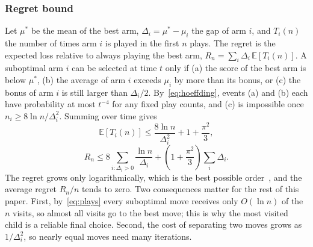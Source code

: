 \subsubsection{Regret bound}
Let $\mu^{*}$ be the mean of the best arm, $\Delta_i = \mu^{*} - \mu_i$ the gap of arm $i$, and $T_i(n)$ the number of times arm $i$ is played in the first $n$ plays. The regret is the expected loss relative to always playing the best arm, $R_n = \sum_i \Delta_i\,\mathbb{E}[T_i(n)]$. A suboptimal arm $i$ can be selected at time $t$ only if (a) the score of the best arm is below $\mu^{*}$, (b) the average of arm $i$ exceeds $\mu_i$ by more than its bonus, or (c) the bonus of arm $i$ is still larger than $\Delta_i/2$. By~\eqref{eq:hoeffding}, events (a) and (b) each have probability at most $t^{-4}$ for any fixed play counts, and (c) is impossible once $n_i \ge 8\ln n/\Delta_i^2$. Summing over time gives~\cite{auer2002finite}
\begin{equation}
\mathbb{E}[T_i(n)] \le \frac{8\ln n}{\Delta_i^2} + 1 + \frac{\pi^2}{3},
\label{eq:plays}
\end{equation}
\begin{equation}
R_n \le 8\sum_{i:\Delta_i>0}\frac{\ln n}{\Delta_i} + \left(1+\frac{\pi^2}{3}\right)\sum_{i}\Delta_i .
\label{eq:regret}
\end{equation}
The regret grows only logarithmically, which is the best possible order~\cite{lai1985asymptotically}, and the average regret $R_n/n$ tends to zero. Two consequences matter for the rest of this paper. First, by~\eqref{eq:plays} every suboptimal move receives only $O(\ln n)$ of the $n$ visits, so almost all visits go to the best move; this is why the most visited child is a reliable final choice. Second, the cost of separating two moves grows as $1/\Delta_i^2$, so nearly equal moves need many iterations.

